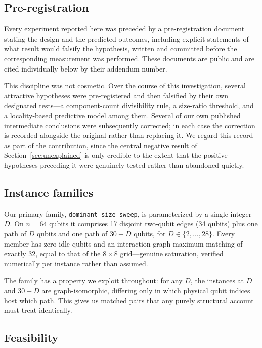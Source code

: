 \documentclass[11pt]{article}
\begin{document}
\subsection{Pre-registration}

Every experiment reported here was preceded by a pre-registration
document stating the design and the predicted outcomes, including
explicit statements of what result would falsify the hypothesis, written
and committed before the corresponding measurement was performed. These
documents are public and are cited individually below by their addendum
number.

This discipline was not cosmetic. Over the course of this
investigation, several attractive hypotheses were pre-registered and
then falsified by their own designated tests---a component-count
divisibility rule, a size-ratio threshold, and a locality-based
predictive model among them. Several of our own published intermediate
conclusions were subsequently corrected; in each case the correction is
recorded alongside the original rather than replacing it. We regard
this record as part of the contribution, since the central negative
result of Section~\ref{sec:unexplained} is only credible to the extent
that the positive hypotheses preceding it were genuinely tested rather
than abandoned quietly.

\subsection{Instance families}

Our primary family, \texttt{dominant\_size\_sweep}, is parameterized by
a single integer $D$. On $n=64$ qubits it comprises 17 disjoint
two-qubit edges (34 qubits) plus one path of $D$ qubits and one path of
$30-D$ qubits, for $D \in \{2, \ldots, 28\}$. Every member has zero
idle qubits and an interaction-graph maximum matching of exactly 32,
equal to that of the $8\times8$ grid---genuine saturation, verified
numerically per instance rather than assumed.

The family has a property we exploit throughout: for any $D$, the
instances at $D$ and $30-D$ are graph-isomorphic, differing only in
which physical qubit indices host which path. This gives us matched
pairs that any purely structural account must treat identically.

\subsection{Feasibility}
\end{document}
